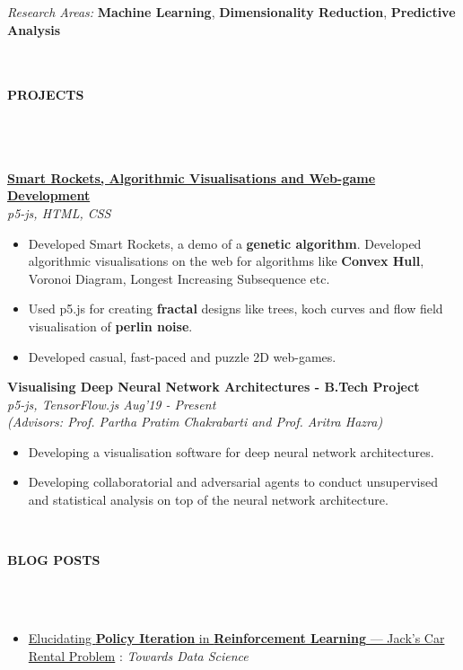 \documentclass[letter,10pt]{book}
\newcommand{\lsep}{-0.5cm}
\newcommand{\psep}{-0.6cm}
\newcommand{\resheading}[1]{{\small \colorbox{mygrey}{\begin{minipage}{0.975\textwidth}{\textbf{#1 \vphantom{p\^{E}}}}\end{minipage}}}}
\begin{document}
\emph{Research Areas:}  \textbf{Machine Learning}, \textbf{Dimensionality Reduction},  \textbf{Predictive}  \textbf{Analysis}
\\
\hspace{0cm}\\[-0.5cm]\\
\resheading{\textbf{ PROJECTS } }\\[\lsep]
\\\\ \large \href{http://cse.iitkgp.ac.in/~arastogi}{\textbf{Smart Rockets, Algorithmic Visualisations and Web-game Development}} \normalsize\\
\emph{p5-js, HTML, CSS} \\[\lsep]
\begin{itemize}
\item Developed Smart Rockets, a demo of a \textbf{genetic algorithm}. Developed algorithmic visualisations on the web for algorithms like \textbf{Convex Hull}, Voronoi Diagram, Longest Increasing Subsequence etc.
\\[\psep]
\item  Used p5.js for creating \textbf{fractal} designs like trees, koch curves and flow field visualisation of \textbf{perlin noise}.\\[\psep]
\item  Developed casual, fast-paced and puzzle 2D web-games.\\
\end{itemize}
\large \textbf{Visualising Deep Neural Network Architectures - B.Tech Project} \normalsize\\
\emph{p5-js, TensorFlow.js \hfill Aug'19 - Present} \\ 
\emph{(Advisors: Prof. Partha Pratim Chakrabarti and Prof. Aritra Hazra)} \\[\lsep]
\begin{itemize}
	\item Developing a visualisation software for deep neural network architectures.\\[\psep]
	\item Developing collaboratorial and adversarial agents to conduct unsupervised and statistical analysis on top of the neural network architecture. 
	\\[\lsep]
\end{itemize}

\hspace{0.5cm}\\[-0.2cm]
\resheading{\textbf{BLOG POSTS} }\\[\lsep]
\\[-0.5em]
\begin{itemize}
	\item
	\href{https://towardsdatascience.com/elucidating-policy-iteration-in-reinforcement-learning-jacks-car-rental-problem-d41b34c8aec7}{Elucidating \textbf{Policy Iteration} in \textbf{Reinforcement Learning} — Jack’s Car Rental Problem} : \textit{Towards Data Science}
\end{itemize}
\end{document}
